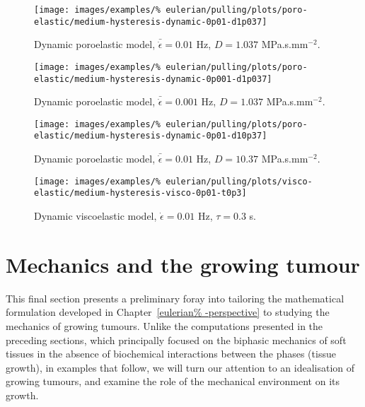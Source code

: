 \begin{figure}[!hptb]
\centering
\texttt{[image: images/examples/\%
eulerian/pulling/plots/poro-elastic/medium-hysteresis-dynamic-0p01-d1p037]}
\caption{Dynamic poroelastic model, $\bar{\dot{\epsilon}}=0.01$ Hz,
  $D=1.037$ MPa.s.mm$^{-2}$.}
\label{medium-hysteresis-dynamic-0p01-d1p037}
\end{figure}

\begin{figure}[!hptb]
\centering
\texttt{[image: images/examples/\%
eulerian/pulling/plots/poro-elastic/medium-hysteresis-dynamic-0p001-d1p037]}
\caption{Dynamic poroelastic model, $\bar{\dot{\epsilon}}=0.001$ Hz,
  $D=1.037$ MPa.s.mm$^{-2}$.}
\label{medium-hysteresis-dynamic-0p001-d1p037}
\end{figure}

\begin{figure}[!hptb]
\centering
\texttt{[image: images/examples/\%
eulerian/pulling/plots/poro-elastic/medium-hysteresis-dynamic-0p01-d10p37]}
\caption{Dynamic poroelastic model, $\bar{\dot{\epsilon}}=0.01$ Hz,
  $D=10.37$ MPa.s.mm$^{-2}$.}
\label{medium-hysteresis-dynamic-0p01-d10p37}
\end{figure}

\begin{figure}[!hptb]
\centering
\texttt{[image: images/examples/\%
eulerian/pulling/plots/visco-elastic/medium-hysteresis-visco-0p01-t0p3]}
\caption{Dynamic viscoelastic model, $\dot{\epsilon}=0.01$ Hz,
  $\tau=0.3$ s.}
\label{medium-hysteresis-visco-0p01-t0p3}
\end{figure}

\section{Mechanics and the growing tumour}
\label{tumour-growth}

This final section presents a preliminary foray into tailoring the
mathematical formulation developed in Chapter~\ref{eulerian%
  -perspective} to studying the mechanics of growing tumours. Unlike
the computations presented in the preceding sections, which
principally focused on the biphasic mechanics of soft tissues in the
absence of biochemical interactions between the phases (tissue
growth), in examples that follow, we will turn our attention to an
idealisation of growing tumours, and examine the role of the
mechanical environment on its growth.


